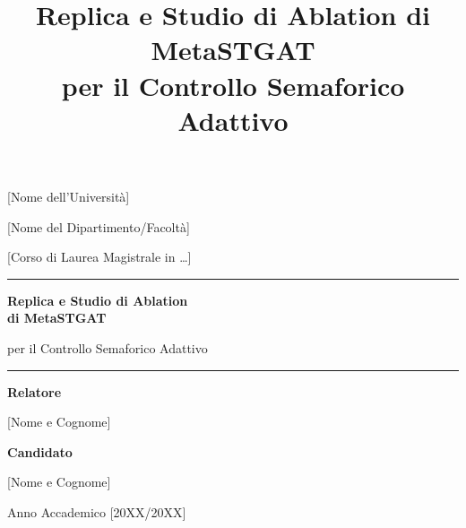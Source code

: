\documentclass[12pt,a4paper]{report}
\title{Replica e Studio di Ablation di MetaSTGAT \\ per il Controllo Semaforico Adattivo}
\author{}
\date{}
\newcommand{\nomeUniversita}{[Nome dell'Università]}
\newcommand{\nomeDipartimento}{[Nome del Dipartimento/Facoltà]}
\newcommand{\nomeCorso}{[Corso di Laurea Magistrale in \dots]}
\newcommand{\nomeRelatore}{[Nome e Cognome]}
\newcommand{\nomeCandidato}{[Nome e Cognome]}
\newcommand{\annoAccademico}{[20XX/20XX]}
\begin{document}
\begin{titlepage}
\centering
\vspace*{0.5cm}
{\large \nomeUniversita \par}
\vspace{0.15cm}
{\large \nomeDipartimento \par}
\vspace{0.15cm}
{\large \nomeCorso \par}

\vspace{2.2cm}
\rule{\textwidth}{0.6pt}\par
\vspace{0.5cm}
{\Huge \bfseries Replica e Studio di Ablation \\[0.2cm] di MetaSTGAT \par}
\vspace{0.4cm}
{\Large per il Controllo Semaforico Adattivo \par}
\vspace{0.5cm}
\rule{\textwidth}{0.6pt}\par

\vspace{2.5cm}
\begin{minipage}[t]{0.47\textwidth}
\raggedright
\large\textbf{Relatore}\par
\normalsize\nomeRelatore\par
\end{minipage}
\hfill
\begin{minipage}[t]{0.47\textwidth}
\raggedleft
\large\textbf{Candidato}\par
\normalsize\nomeCandidato\par
\end{minipage}

\vfill
{\large Anno Accademico \annoAccademico \par}
\vspace{0.5cm}
\end{titlepage}

\newpage
\thispagestyle{empty}
\null
\newpage




\tableofcontents
\listoffigures
\listoftables



\cleardoublepage
{}








\end{document}
